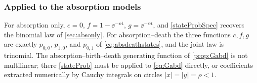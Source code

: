 \subsubsection*{Applied to the absorption models}

For absorption only, \(c=0\), \(f=1-\ee^{-\alpha t}\), \(g=\ee^{-\alpha t}\), and \cref{stateProbSpec} recovers the binomial law of \cref{sec:absonly}. For absorption--death the three functions \(c,f,g\) are exactly \(p_{0,0}\), \(p_{1,0}\), and \(p_{0,1}\) of \cref{eq:absdeathstates}, and the joint law is trinomial. The absorption--birth--death generating function of \cref{prop:Gabd} is not multilinear; there \cref{stateProb} must be applied to \cref{eq:Gabd} directly, or coefficients extracted numerically by Cauchy integrals on circles \(|x|=|y|=\rho<1\).
